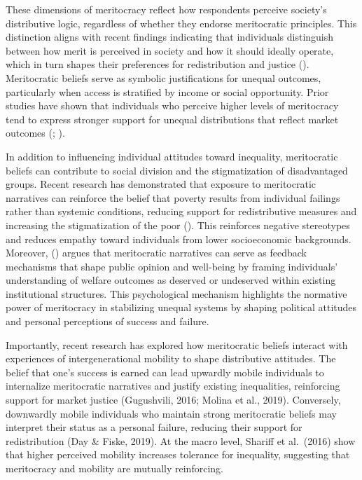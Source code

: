 \documentclass[
  12pt,
]{article}
\begin{document}
These dimensions of meritocracy reflect how respondents perceive
society's distributive logic, regardless of whether they endorse
meritocratic principles. This distinction aligns with recent findings
indicating that individuals distinguish between how merit is perceived
in society and how it should ideally operate, which in turn shapes their
preferences for redistribution and justice
(). Meritocratic beliefs serve as symbolic justifications for
unequal outcomes, particularly when access is stratified by income or
social opportunity. Prior studies have shown that individuals who
perceive higher levels of meritocracy tend to express stronger support
for unequal distributions that reflect market outcomes
(;
).

In addition to influencing individual attitudes toward inequality,
meritocratic beliefs can contribute to social division and the
stigmatization of disadvantaged groups. Recent research has demonstrated
that exposure to meritocratic narratives can reinforce the belief that
poverty results from individual failings rather than systemic
conditions, reducing support for redistributive measures and increasing
the stigmatization of the poor
().
This reinforces negative stereotypes and reduces empathy toward
individuals from lower socioeconomic backgrounds. Moreover,
()
argues that meritocratic narratives can serve as feedback mechanisms
that shape public opinion and well-being by framing individuals'
understanding of welfare outcomes as deserved or undeserved within
existing institutional structures. This psychological mechanism
highlights the normative power of meritocracy in stabilizing unequal
systems by shaping political attitudes and personal perceptions of
success and failure.

Importantly, recent research has explored how meritocratic beliefs
interact with experiences of intergenerational mobility to shape
distributive attitudes. The belief that one's success is earned can lead
upwardly mobile individuals to internalize meritocratic narratives and
justify existing inequalities, reinforcing support for market justice
(Gugushvili, 2016; Molina et al., 2019). Conversely, downwardly mobile
individuals who maintain strong meritocratic beliefs may interpret their
status as a personal failure, reducing their support for redistribution
(Day \& Fiske, 2019). At the macro level, Shariff et al.~(2016) show
that higher perceived mobility increases tolerance for inequality,
suggesting that meritocracy and mobility are mutually reinforcing.
\end{document}
